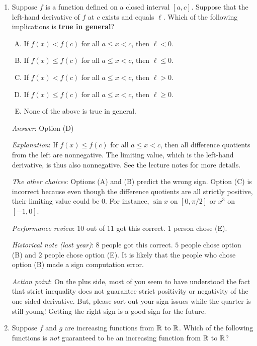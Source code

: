 \documentclass[10pt]{amsart}
\begin{document}
\begin{enumerate}

\item Suppose $f$ is a function defined on a closed interval
  $[a,c]$. Suppose that the left-hand derivative of $f$ at $c$ exists
  and equals $\ell$. Which of the following implications is {\bf true
  in general}?

  \begin{enumerate}[(A)]
  \item If $f(x) < f(c)$ for all $a \le x < c$, then $\ell < 0$.
  \item If $f(x) \le f(c)$ for all $a \le x < c$, then $\ell \le 0$.
  \item If $f(x) < f(c)$ for all $a \le x < c$, then $\ell > 0$.
  \item If $f(x) \le f(c)$ for all $a \le x < c$, then $\ell \ge 0$.
  \item None of the above is true in general.
  \end{enumerate}

  {\em Answer}: Option (D)

  {\em Explanation}: If $f(x) \le f(c)$ for all $a \le x < c$, then
  all difference quotients from the left are nonnegative. The limiting
  value, which is the left-hand derivative, is thus also
  nonnegative. See the lecture notes for more details.

  {\em The other choices}: Options (A) and (B) predict the wrong
  sign. Option (C) is incorrect because even though the difference
  quotients are all strictly positive, their limiting value could be
  $0$. For instance, $\sin x$ on $[0,\pi/2]$ or $x^3$ on $[-1,0]$.

  {\em Performance review}: $10$ out of $11$ got this correct. $1$
  person chose (E).

  {\em Historical note (last year)}: $8$ people got this correct. $5$
  people chose option (B) and $2$ people chose option (E). It is
  likely that the people who chose option (B) made a sign computation
  error.

  {\em Action point}: On the plus side, most of you seem to have
  understood the fact that strict inequality does not guarantee strict
  positivity or negativity of the one-sided derivative. But, please
  sort out your sign issues while the quarter is still young! Getting
  the right sign is a good sign for the future.

\item Suppose $f$ and $g$ are increasing functions from $\mathbb{R}$ to
  $\mathbb{R}$. Which of the following functions is {\em not} guaranteed to be
  an increasing function from $\mathbb{R}$ to $\mathbb{R}$?


\end{enumerate}
\end{document}
